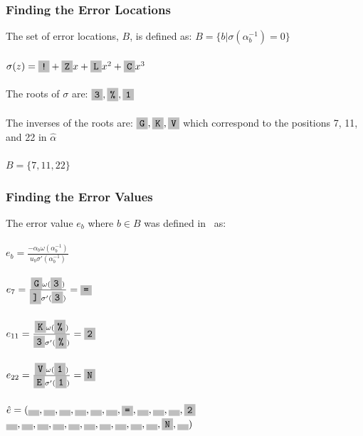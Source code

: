 \documentclass{beamer}
\begin{document}
\begin{frame}
	\frametitle{Finding the Error Locations}
    The set of error locations, $B$, is defined as: $B = \{b | \sigma(\alpha_{b}^{-1}) = 0\}$\\~\\
    
    $\sigma(z) = \f{!} + \f{Z}x + \f{L}x^{2} + \f{C}x^{3}$\\~\\
    
    The roots of $\sigma$ are: $\f{3}, \f{\%}, \f{1}$\\~\\
    The inverses of the roots are: $\f{G}, \f{K}, \f{V}$ which correspond to the positions 7, 11, and 22 in $\hat{\alpha}$ \\~\\
    $B = \{7, 11, 22\}$
    

\end{frame}

\begin{frame}
	\frametitle{Finding the Error Values}
    The error value $e_{b}$ where $b \in B$ was defined in~\cite{Hall:2012} as:\\~\\
    
    $e_{b} = \frac{-\alpha_{b} \omega(\alpha_{b}^{-1})}{u_{b} \sigma'(\alpha_{b}^{-1})}$\\~\\
    
    $e_{7} = \frac{\f{G} \omega(\f{3})}{\f{]} \sigma'(\f{3})} = \f{=}$\\~\\
    
    $e_{11} = \frac{\f{K} \omega(\f{\%})}{\f{3} \sigma'(\f{\%})} = \f{2}$\\~\\
    
    $e_{22} = \frac{\f{V} \omega(\f{1})}{\f{E} \sigma'(\f{1})} = \f{N}$\\~\\
    
    $\hat{e} = (\f{ }, \f{ }, \f{ }, \f{ }, \f{ }, \f{ }, \f{=}, \f{ }, \f{ }, \f{ }, \f{2}$
    \hspace*{4.5ex} $\f{ }, \f{ }, \f{ }, \f{ }, \f{ }, \f{ }, \f{ }, \f{ }, \f{ }, \f{ }, \f{N}, \f{ })$
    

\end{frame}
\end{document}
